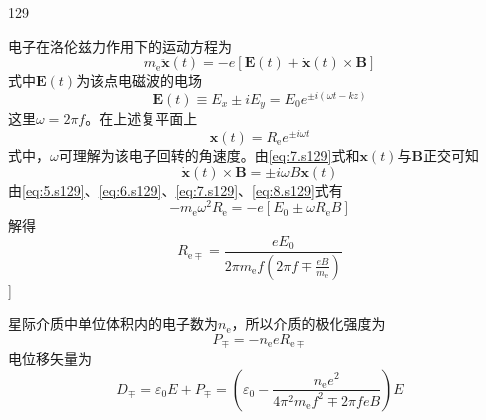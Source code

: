 \begin{solution}{129}
\begin{subsolution}
        电子在洛伦兹力作用下的运动方程为
        \begin{equation}
            m _ {\mathrm{e}} \ddot {\boldsymbol {x}} (t) = - e [ \boldsymbol {E} (t) + \dot {\boldsymbol {x}} (t) \times \boldsymbol {B} ]
            \label{eq:5.s129}
        \end{equation}
        式中$\boldsymbol {E} (t)$为该点电磁波的电场
        \begin{equation}
            \boldsymbol {E} (t) \equiv E _ {x} \pm i E _ {y} = E _ {0} e ^ {\pm i (\omega t - k z)}
            \label{eq:6.s129}
        \end{equation}
        这里$\omega = 2 \pi f$。在上述复平面上
        \begin{equation}
            \boldsymbol {x} (t) = R _ {\mathrm{e}} e ^ {\pm i \omega t}
            \label{eq:7.s129}
        \end{equation}
        式中，$\omega$可理解为该电子回转的角速度。由\eqref{eq:7.s129}式和$\boldsymbol {x} (t)$与$\boldsymbol {B}$正交可知
        \begin{equation}
            \dot {\boldsymbol {x}} (t) \times \boldsymbol {B} = \pm i \omega B \boldsymbol {x} (t)
            \label{eq:8.s129}
        \end{equation}
        由\eqref{eq:5.s129}、\eqref{eq:6.s129}、\eqref{eq:7.s129}、\eqref{eq:8.s129}式有
        \begin{equation}
            - m _ {\mathrm{e}} \omega^ {2} R _ {\mathrm{e}} = - e [ E _ {0} \pm \omega R _ {\mathrm{e}} B ]
            \label{eq:9.s129}
        \end{equation}
        解得
        \begin{equation}
            R _ {\mathrm{e} \mp} = \frac {e E _ {0}}{2 \pi m _ {\mathrm{e}} f (2 \pi f \mp \frac {e B}{m _ {\mathrm{e}}})}
            \label{eq:10.s129}
        \end{equation}
        ]
    \end{subsolution}
    \begin{subsolution}
        星际介质中单位体积内的电子数为$n _ { \mathrm { e } }$，所以介质的极化强度为
        \begin{equation}
            P _ {\mp} = - n _ {\mathrm{e}} e R _ {\mathrm{e} \mp}
            \label{eq:11.s129}
        \end{equation}
        电位移矢量为
        \begin{equation}
            D _ {\mp} = \varepsilon_ {0} E + P _ {\mp} = \left(\varepsilon_ {0} - \frac {n _ {\mathrm{e}} e ^ {2}}{4 \pi^ {2} m _ {\mathrm{e}} f ^ {2} \mp 2 \pi f e B}\right) E

\end{equation}
\end{subsolution}
\end{solution}
